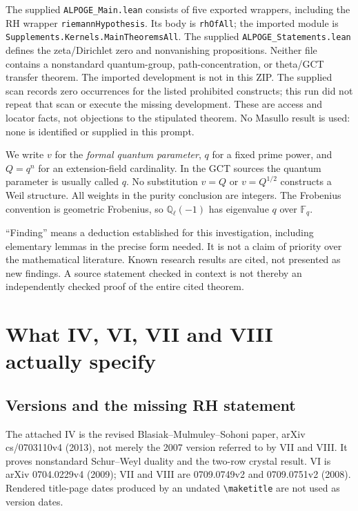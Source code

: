 \documentclass[11pt,a4paper]{article}
\newcommand{\Q}{\mathbb Q}\newcommand{\Z}{\mathbb Z}\newcommand{\C}{\mathbb C}\newcommand{\N}{\mathbb N}\newcommand{\F}{\mathbb F}
\theoremstyle{named}\newtheorem{finding}{Finding}[section]
\theoremstyle{definition}\newtheorem{definition}[finding]{Definition}
\theoremstyle{remark}\newtheorem{remark}[finding]{Remark}
\begin{document}
The supplied \texttt{ALPOGE\_Main.lean} consists of five exported wrappers, including the RH wrapper \texttt{riemannHypothesis}. Its body is \texttt{rhOfAll}; the imported module is \texttt{Supplements.Kernels.\allowbreak MainTheoremsAll}. The supplied \texttt{ALPOGE\_Statements.lean} defines the zeta/Dirichlet zero and nonvanishing propositions. Neither file contains a nonstandard quantum-group, path-concentration, or theta/GCT transfer theorem. The imported development is not in this ZIP. The supplied scan records zero occurrences for the listed prohibited constructs; this run did not repeat that scan or execute the missing development. These are access and locator facts, not objections to the stipulated theorem. No Masullo result is used: none is identified or supplied in this prompt.

We write $v$ for the \emph{formal quantum parameter}, $q$ for a fixed prime power, and $Q=q^n$ for an extension-field cardinality. In the GCT sources the quantum parameter is usually called $q$. No substitution $v=Q$ or $v=Q^{1/2}$ constructs a Weil structure. All weights in the purity conclusion are integers. The Frobenius convention is geometric Frobenius, so $\Q_\ell(-1)$ has eigenvalue $q$ over $\F_q$.

``Finding'' means a deduction established for this investigation, including elementary lemmas in the precise form needed. It is not a claim of priority over the mathematical literature. Known research results are cited, not presented as new findings. A source statement checked in context is not thereby an independently checked proof of the entire cited theorem.

\section{What IV, VI, VII and VIII actually specify}\label{sec:sources}
\subsection{Versions and the missing RH statement}
The attached IV is the revised Blasiak--Mulmuley--Sohoni paper, arXiv cs/0703110v4 (2013), not merely the 2007 version referred to by VII and VIII. It proves nonstandard Schur--Weyl duality and the two-row crystal result. VI is arXiv 0704.0229v4 (2009); VII and VIII are 0709.0749v2 and 0709.0751v2 (2008). Rendered title-page dates produced by an undated \verb|\maketitle| are not used as version dates.
\end{document}
